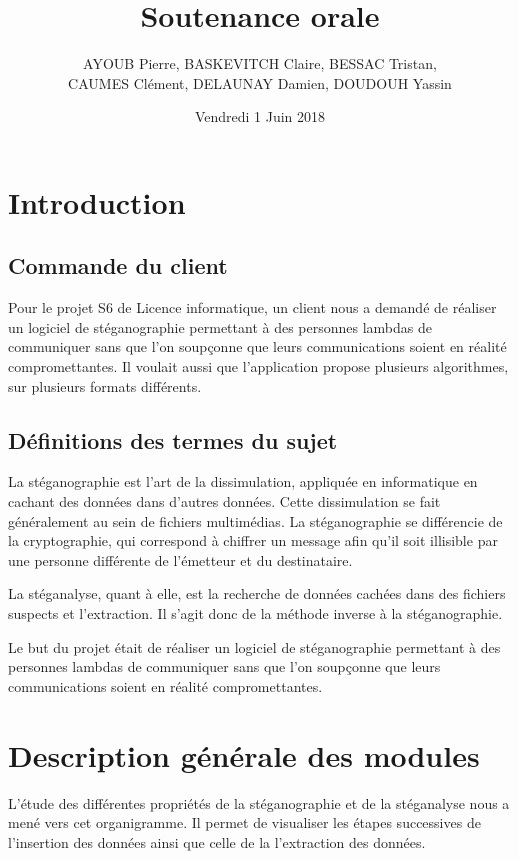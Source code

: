 \documentclass[11pt]{article}
\title{\huge{\textbf Soutenance orale}}
\author{AYOUB Pierre, BASKEVITCH Claire, BESSAC Tristan, \\
CAUMES Clément, DELAUNAY Damien, DOUDOUH Yassin}
\date{Vendredi 1 Juin 2018}
\begin{document}
\maketitle
\vspace{20em}
\newpage

\tableofcontents

\newpage

\section{Introduction}

\subsection{Commande du client}

Pour le projet S6 de Licence informatique, un client nous a demandé de 
réaliser un logiciel de stéganographie permettant à des
personnes lambdas de communiquer sans que l'on soupçonne que leurs
communications soient en réalité compromettantes. 
Il voulait aussi que l'application propose plusieurs algorithmes, sur 
plusieurs formats différents. 
   

\subsection{Définitions des termes du sujet}

La stéganographie est l'art de la dissimulation, appliquée en informatique en
cachant des données dans d'autres données. Cette dissimulation se fait
généralement au sein de fichiers multimédias. La stéganographie se différencie
de la cryptographie, qui correspond à chiffrer un message afin qu'il soit
illisible par une personne différente de l'émetteur et du destinataire. 

La stéganalyse, quant à elle, est la recherche de données cachées dans des
fichiers suspects et l'extraction. Il s'agit donc de la méthode inverse à la
stéganographie. 

Le but du projet était de réaliser un logiciel de stéganographie permettant à des
personnes lambdas de communiquer sans que l'on soupçonne que leurs
communications soient en réalité compromettantes. 

\section{Description générale des modules}

L'étude des différentes propriétés de la stéganographie et de la stéganalyse 
nous a mené vers cet organigramme. 
Il permet de visualiser les étapes successives de l'insertion des données ainsi
que celle de la l'extraction des données.
\end{document}
